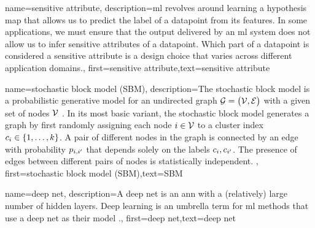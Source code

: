 {name={sensitive attribute},
	description={\gls{ml} revolves around learning a \gls{hypothesis} map that allows 
		us to predict the \gls{label} of a \gls{datapoint} from its \gls{feature}s. In some 
		applications, we must ensure that the output delivered by an \gls{ml} system does 
		not allow us to infer sensitive attributes of a \gls{datapoint}. Which part 
		of a \gls{datapoint} is considered a sensitive attribute is a design 
		choice that varies across different application domains.},
	first={sensitive attribute},text={sensitive attribute} 
}


{name={stochastic block model (SBM)},
	description={The stochastic block \gls{model} is a 
		probabilistic generative \gls{model} for an undirected \gls{graph} $\mathcal{G} = \big( \mathcal{V}, \mathcal{E} \big)$ 
		with a given set of nodes $\mathcal{V}$ \cite{AbbeSBM2018}. In its most basic variant, 
		the stochastic block \gls{model} generates a \gls{graph} by first randomly assigning each node $i \in \mathcal{V}$ to 
		a \gls{cluster} index $c_{i} \in \{1,\ldots,k\}$. A pair of different nodes in the 
		\gls{graph} is connected by an edge with \gls{probability} $p_{i,i'}$ that depends 
		solely on the \gls{label}s $c_{i}, c_{i'}$. 
		The presence of edges between different pairs of 
		nodes is statistically independent. },
	first={stochastic block model (SBM)},text={SBM} 
}

{name={deep net},
	description={A deep net is an \gls{ann} with a (relatively) large number of 
	hidden layers. Deep learning is an umbrella term for \gls{ml} methods that use a deep 
	net as their \gls{model} \cite{Goodfellow-et-al-2016}.},
	first={deep net},text={deep net} 
}

\newcommand{\gaussiancenter}{3}

